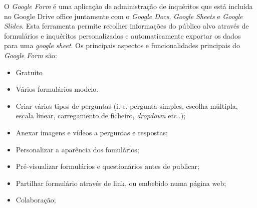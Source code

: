 O \textit{Google Form} é uma aplicação de administração de inquéritos que está incluída no Google Drive office juntamente com o \textit{Google Docs}\cite{gdocs}, \textit{Google Sheets} e \textit{Google Slides}\cite{gslides}. Esta ferramenta permite recolher informações do público alvo através de formulários e inquéritos personalizados e automaticamente exportar os dados para uma \textit{google sheet}. Os principais aspectos e funcionalidades principais do \textit{Google Form}  são:
\begin{itemize}
	\item Gratuito
	\item Vários formulários modelo.
	\item Criar vários tipos de perguntas (i. e. pergunta simples, escolha múltipla, escala linear, carregamento de ficheiro, \textit{dropdown} etc..); 
	\item Anexar imagens e vídeos a perguntas e respostas;
	\item Personalizar a aparência dos fomulários; 
	\item Pré-visualizar formulários e questionários antes de publicar;
	\item Partilhar formulário através de link, ou embebido numa página web;
	\item Colaboração;
\end{itemize}


